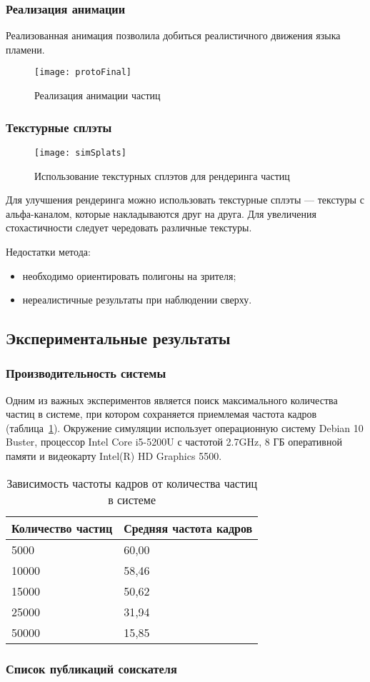 \begin{frame}
\frametitle{Реализация анимации}
Реализованная анимация позволила добиться реалистичного движения языка пламени.
\begin{figure}[htb]
	\centering
    \texttt{[image: protoFinal]}
    \caption{Реализация анимации частиц}%
    \label{fig:protoFinal}
\end{figure}
\end{frame}

\begin{frame}[t]
\frametitle{Текстурные сплэты}
\begin{wrapfigure}{r}{0.3\textwidth}
	\centering
    \texttt{[image: simSplats]}
    \caption{Использование текстурных сплэтов для рендеринга частиц}%
    \label{fig:protoSplats}
\end{wrapfigure}
Для улучшения рендеринга можно использовать текстурные сплэты --- текстуры с
альфа-каналом, которые накладываются друг на друга. Для
увеличения стохастичности следует чередовать различные текстуры.

Недостатки метода:
\begin{itemize}
    \item необходимо ориентировать полигоны на зрителя;
    \item нереалистичные результаты при наблюдении сверху.
\end{itemize}
\end{frame}

\subsection{Экспериментальные результаты}
\begin{frame}
\frametitle{Производительность системы}
Одним из важных экспериментов является поиск максимального количества частиц в
системе, при котором сохраняется приемлемая частота кадров
(таблица~\ref{table:amountBench}).
Окружение симуляции использует операционную систему Debian 10 Buster, процессор
Intel Core i5-5200U с частотой 2.7GHz, 8 ГБ оперативной памяти и видеокарту
Intel(R) HD Graphics 5500.
\begin{table}[htb]
\caption{Зависимость частоты кадров от количества частиц в системе}%
\label{table:amountBench}
\centering
\small
\begin{tabular}{| l | l |}
    \hline
    Количество частиц & Средняя частота кадров \\
    \hline
    5000 &  60,00 \\
    \hline
    10000 & 58,46 \\
    \hline
    15000 & 50,62 \\
    \hline
    25000 & 31,94 \\
    \hline
    50000 & 15,85 \\
    \hline
\end{tabular}
\end{table}
\end{frame}

\begin{frame}[t,allowframebreaks]
\frametitle{Список публикаций соискателя}
\nocite{*}
\sloppy\printbibliography[
    category=AuthorSources,
    heading=none,
    resetnumbers,
]
\end{frame}
